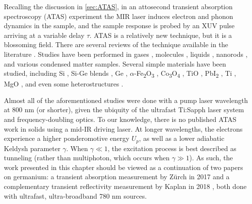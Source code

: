 Recalling the discussion in \cref{sec:ATAS}, in an attosecond transient absorption spectroscopy (ATAS) experiment the MIR laser induces electron and phonon dynamics in the sample, and the sample response is probed by an XUV pulse arriving at a variable delay $\tau$. ATAS is a relatively new technique, but it is a blossoming field. There are several reviews of the technique available in the literature \cite{beckProbingUltrafastDynamics2015,leoneWhatWillIt2014,changAttosecondOpticsTechnology2016,ramaseshaRealTimeProbingElectron2016,geneauxTransientAbsorptionSpectroscopy2019}. Studies have been performed in gases \cite{goulielmakisRealtimeObservationValence2010,wangAttosecondTimeResolvedAutoionization2010,caoAttosecondTransientAbsorption2016,chewAttosecondTransientAbsorption2018,chenLightinducedStatesAttosecond2012,bellIntensityDependenceLightinduced2013,linStrongfieldInducedXUV2012,bernhardtHighspectralresolutionAttosecondAbsorption2014,liInvestigationCouplingMechanisms2015,beckAttosecondTransientAbsorption2014}, molecules \cite{hoslerCharacterizationVibrationalWave2013,attarCoretovalenceSpectroscopicDetection2014,warrickProbingDynamicsRydberg2016}, liquids \cite{ziemkiewiczFemtosecondTimeresolvedXUV2014}, nanorods \cite{porterPhotoexcitedSmallPolaron2018}, and various condensed matter samples. Several simple materials have been studied, including Si \cite{schultzeAttosecondBandgapDynamics2014,cushingDifferentiatingPhotoexcitedCarrier2019}, Si-Ge blends \cite{zurchUltrafastCarrierThermalization2017}, Ge \cite{zurchDirectSimultaneousObservation2017,kaplanFemtosecondTrackingCarrier2018}, $\alpha$-Fe\textsubscript{2}O\textsubscript{3} \cite{vura-weisFemtosecondEdgeSpectroscopy2013}, Co\textsubscript{3}O\textsubscript{4} \cite{jiangCharacterizationPhotoInducedCharge2014}, TiO \cite{vaidaFemtosecondExtremeUltraviolet2016}, PbI\textsubscript{2} \cite{linCarrierSpecificFemtosecondXUV2017}, Ti \cite{volkovAttosecondScreeningDynamics2019}, MgO \cite{geneauxAttosecondTimeDomainMeasurement2020}, and even some heterostructures \cite{marshUltrafastTimeresolvedExtreme2018,cushingLayerresolvedUltrafastExtreme2020}.

Almost all of the aforementioned studies were done with a pump laser wavelength at 800 nm (or shorter), given the ubiquity of the ultrafast Ti:Sapph laser system and frequency-doubling optics. To our knowledge, there is no published ATAS work in solids using a mid-IR driving laser. At longer wavelengths, the electrons experience a higher ponderomotive energy $U_p$, as well as a lower adiabatic Keldysh parameter $\gamma$. When $\gamma \ll 1$, the excitation process is best described as tunneling (rather than multiphoton, which occurs when $\gamma \gg 1$). As such, the work presented in this chapter should be viewed as a continuation of two papers on germanium: a transient absorption measurement by Z\"{u}rch in 2017 \cite{zurchDirectSimultaneousObservation2017} and a complementary transient reflectivity measurement by Kaplan in 2018 \cite{kaplanFemtosecondTrackingCarrier2018}, both done with ultrafast, ultra-broadband 780 nm sources.

